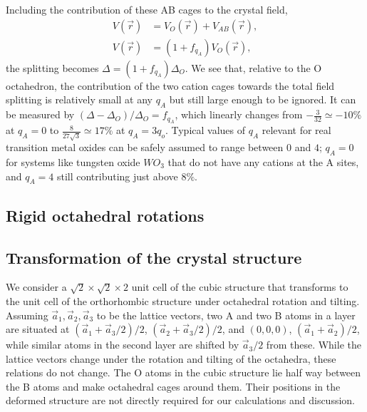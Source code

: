 \documentclass[a4paper,prb]{revtex4-1}  %
\newcommand{\com}[1]{}
\newcommand{\az}[1]{{\color{magenta}{#1}}} %
\begin{document}
Including the contribution of these AB cages to the crystal field,
\begin{align}
V(\vec r) &= V_{O}(\vec r) + V_{AB}(\vec r),\\
V(\vec r)  &= (1+f_{q_A}) V_{O}(\vec r),
\end{align}
the 
 splitting becomes
$\Delta = (1+f_{q_A})\Delta_O$.
We see that, relative to the O octahedron,
 the contribution of the
 two cation cages towards the total field splitting
 is relatively small at any $q_A$ but
 still large enough to be ignored.
It can be measured by $(\Delta-\Delta_O)/\Delta_O=f_{q_A}$,
which linearly changes from 
$-\frac{3}{32}\simeq -10\%$ at $q_A=0$
to $\frac{8}{27 \sqrt{3}}\simeq 17\%$ at $q_A=3q_o$. 
Typical values of $q_A$ relevant for real transition metal oxides
can be safely assumed to range between $0$ and $4$;  
$q_A=0$ for systems like tungsten oxide $WO_3$ that do not have any cations at the A sites,
and $q_A=4$ still contributing just above $8\%$. 
\az{Not just this pot, deformation induces $l=2$ V2m that can couple much more strongly.... bcs of larger D222. 
}







\subsection{Rigid octahedral rotations}




\subsection{Transformation of the crystal structure}


\com{
Coordinates of the Oxygen atoms transform according to 
the rotation matrix $R$.
While the d-orbitals basis states attached to the octahedron transform according to
$\mathcal{R}$.
}
\az{figure vesta structure, label octahedra 1-4.}


We consider a
$\sqrt{2}\times\sqrt{2}\times 2$ unit cell of the cubic structure that transforms
to the unit cell of the orthorhombic structure under octahedral rotation and tilting.
Assuming $\vec a_1,\vec a_2,\vec a_3$ to be the lattice vectors,
two A and two B atoms in a layer are situated at
$(\vec a_1 + \vec a_3/2)/2$, $(\vec a_2+ \vec a_3/2)/2$,
and $(0,0,0)$, $(\vec a_1 + \vec a_2)/2$, 
while similar atoms in the second layer are shifted by $\vec a_3/2$ from these.
While the lattice vectors change under the rotation and tilting of the octahedra, 
these relations do not change.
The O atoms in the cubic structure lie half way between the B atoms and make octahedral cages around them.
Their positions in the deformed structure %
are not directly required for our calculations and discussion.
\end{document}
